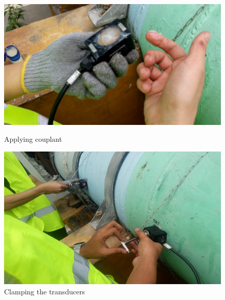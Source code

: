\begin{figure}[ht]
	\begin{minipage}[b]{0.5\linewidth}
		\centering
		\includegraphics[width=\textwidth]{figures/ch02_flowmeasurement03}
		\caption{Applying couplant}
		\label{ch02_flowmeasurement03}
	\end{minipage}
	\hspace{0.05cm}
	\begin{minipage}[b]{0.5\linewidth}
		\centering
		\includegraphics[width=\textwidth]{figures/ch02_flowmeasurement04}
		\caption{Clamping the transducers}
		\label{ch02_flowmeasurement04}
	\end{minipage}
\end{figure}

